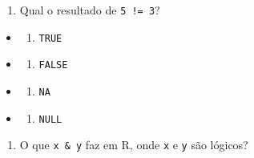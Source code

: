 \documentclass[
]{book}
\providecommand{\tightlist}{%
  \setlength{\itemsep}{0pt}\setlength{\parskip}{0pt}}
\begin{document}
\begin{enumerate}
\def\labelenumi{\arabic{enumi}.}
\setcounter{enumi}{2}
\tightlist
\item
  Qual o resultado de \texttt{5\ !=\ 3}?
\end{enumerate}

\begin{itemize}
\tightlist
\item
  \begin{enumerate}
  \def\labelenumi{\alph{enumi})}
  \tightlist
  \item
    \texttt{TRUE}
  \end{enumerate}
\item
  \begin{enumerate}
  \def\labelenumi{\alph{enumi})}
  \setcounter{enumi}{1}
  \tightlist
  \item
    \texttt{FALSE}
  \end{enumerate}
\item
  \begin{enumerate}
  \def\labelenumi{\alph{enumi})}
  \setcounter{enumi}{2}
  \tightlist
  \item
    \texttt{NA}
  \end{enumerate}
\item
  \begin{enumerate}
  \def\labelenumi{\alph{enumi})}
  \setcounter{enumi}{3}
  \tightlist
  \item
    \texttt{NULL}
  \end{enumerate}
\end{itemize}

\begin{enumerate}
\def\labelenumi{\arabic{enumi}.}
\setcounter{enumi}{3}
\tightlist
\item
  O que \texttt{x\ \&\ y} faz em R, onde \texttt{x} e \texttt{y} são lógicos?
\end{enumerate}
\end{document}
